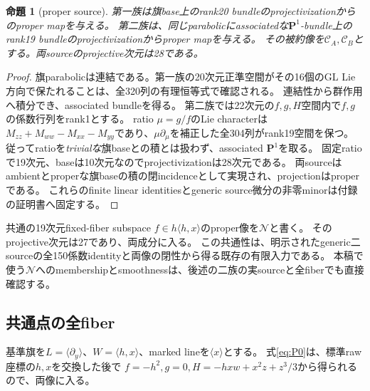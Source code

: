 \documentclass[11pt,a4paper]{ltjsarticle}
\newcommand{\PP}{\mathbf P}
\newcommand{\CA}{\mathcal C_A}
\newcommand{\CB}{\mathcal C_B}
\newcommand{\cN}{\mathcal N}
\newtheorem{proposition}[theorem]{命題}
\theoremstyle{definition}
\theoremstyle{remark}
\begin{document}
\begin{proposition}[proper source]\label{prop:proper}
第一族は旗base上のrank20 bundleのprojectivizationからのproper mapを与える。
第二族は、同じparabolicにassociatedな$\PP^1$-bundle上のrank19 bundleのprojectivizationからproper mapを与える。
その被約像を$\CA,\CB$とする。両sourceのprojective次元は28である。
\end{proposition}
\begin{proof}
旗parabolicは連結である。第一族の20次元正準空間がその16個のGL Lie方向で保たれることは、全320列の有理恒等式で確認される。
連結性から群作用へ積分でき、associated bundleを得る。
第二族では22次元の$f,g,H$空間内で$f,g$の係数行列をrank1とする。
ratio $\mu=g/f$のLie characterは
$M_{zz}+M_{ww}-M_{xx}-M_{yy}$であり、$\mu\partial_\mu$を補正した全304列がrank19空間を保つ。
従ってratioを\emph{trivialな}旗baseとの積とは扱わず、associated $\PP^1$を取る。
固定ratioで19次元、baseは10次元なのでprojectivizationは28次元である。
両sourceはambientとproperな旗baseの積の閉incidenceとして実現され、projectionはproperである。
これらのfinite linear identitiesとgeneric source微分の非零minorは付録の証明書へ固定する。
\end{proof}

共通の19次元fixed-fiber subspace $f\in h\langle h,x\rangle$のproper像を$\cN$と書く。
そのprojective次元は27であり、両成分に入る。
この共通性は、明示されたgeneric二sourceの全150係数identityと両像の閉性から得る既存の有限入力である。
本稿で使う$\cN$へのmembershipとsmoothnessは、後述の二族の実sourceと全fiberでも直接確認する。

\subsection{共通点の全fiber}

基準旗を$L=\langle\partial_y\rangle$、$W=\langle h,x\rangle$、marked lineを$\langle x\rangle$とする。
式\eqref{eq:P0}は、標準raw座標の$h,x$を交換した後で
$f=-h^2,g=0,H=-hxw+x^2z+z^3/3$から得られるので、両像に入る。
\end{document}
